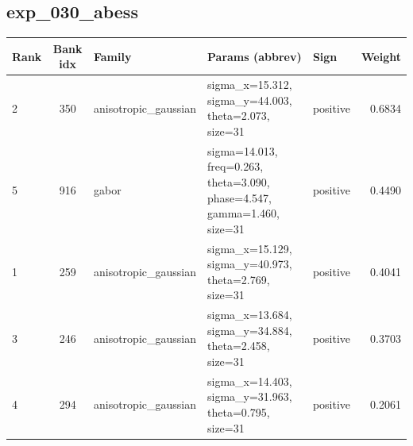 \documentclass{article}
\begin{document}
\subsection*{exp\_030\_abess}
\begin{center}
\begin{tabular}{lclllr}
\toprule
Rank & Bank idx & Family & Params (abbrev) & Sign & Weight \\
\midrule

2 & 350 & anisotropic\_gaussian & sigma\_x=15.312, sigma\_y=44.003, theta=2.073, size=31 & positive & 0.6834 \\
5 & 916 & gabor & sigma=14.013, freq=0.263, theta=3.090, phase=4.547, gamma=1.460, size=31 & positive & 0.4490 \\
1 & 259 & anisotropic\_gaussian & sigma\_x=15.129, sigma\_y=40.973, theta=2.769, size=31 & positive & 0.4041 \\
3 & 246 & anisotropic\_gaussian & sigma\_x=13.684, sigma\_y=34.884, theta=2.458, size=31 & positive & 0.3703 \\
4 & 294 & anisotropic\_gaussian & sigma\_x=14.403, sigma\_y=31.963, theta=0.795, size=31 & positive & 0.2061 \\
\bottomrule
\end{tabular}
\end{center}
\end{document}
